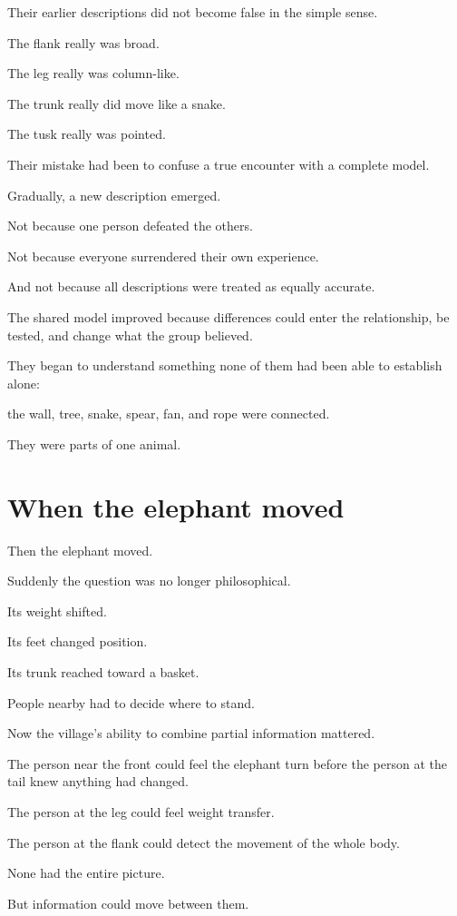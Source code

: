 \documentclass[11pt,a4paper]{article}
\begin{document}
Their earlier descriptions did not become false in the simple sense.

The flank really was broad.

The leg really was column-like.

The trunk really did move like a snake.

The tusk really was pointed.

Their mistake had been to confuse a true encounter with a complete model.

Gradually, a new description emerged.

Not because one person defeated the others.

Not because everyone surrendered their own experience.

And not because all descriptions were treated as equally accurate.

The shared model improved because differences could enter the relationship, be tested, and change what the group believed.

They began to understand something none of them had been able to establish alone:

the wall, tree, snake, spear, fan, and rope were connected.

They were parts of one animal.

\section*{When the elephant moved}

Then the elephant moved.

Suddenly the question was no longer philosophical.

Its weight shifted.

Its feet changed position.

Its trunk reached toward a basket.

People nearby had to decide where to stand.

Now the village's ability to combine partial information mattered.

The person near the front could feel the elephant turn before the person at the tail knew anything had changed.

The person at the leg could feel weight transfer.

The person at the flank could detect the movement of the whole body.

None had the entire picture.

But information could move between them.
\end{document}
